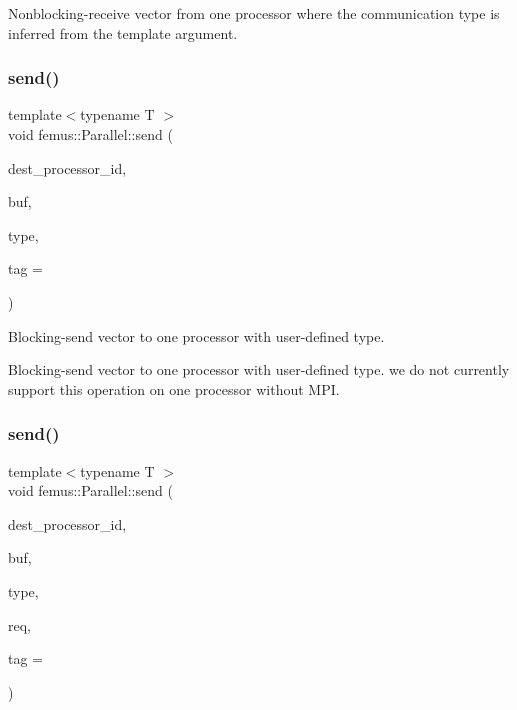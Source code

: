 Nonblocking-\/receive vector from one processor where the communication type is inferred from the template argument. \mbox{\label{namespacefemus_1_1_parallel_a3126d0149eca349995ce4f5a314e3a89}} 
\subsubsection{\texorpdfstring{send()}{send()}\hspace{0.1cm}{\footnotesize\ttfamily [1/4]}}
{\footnotesize\ttfamily template$<$typename T $>$ \\
void femus\+::\+Parallel\+::send (\begin{DoxyParamCaption}\item[{const unsigned int}]{dest\+\_\+processor\+\_\+id,  }\item[{std\+::vector$<$ T $>$ \&}]{buf,  }\item[{const \mbox{\hyperlink{classfemus_1_1_parallel_1_1_data_type}{Data\+Type}} \&}]{type,  }\item[{const int}]{tag = {} }\end{DoxyParamCaption})\hspace{0.3cm}{\ttfamily [inline]}}

Blocking-\/send vector to one processor with user-\/defined type.

Blocking-\/send vector to one processor with user-\/defined type. we do not currently support this operation on one processor without M\+PI. \mbox{\label{namespacefemus_1_1_parallel_a9e7ecc622b087c99acc5c1b37b6e6c90}} 
\subsubsection{\texorpdfstring{send()}{send()}\hspace{0.1cm}{\footnotesize\ttfamily [2/4]}}
{\footnotesize\ttfamily template$<$typename T $>$ \\
void femus\+::\+Parallel\+::send (\begin{DoxyParamCaption}\item[{const unsigned int}]{dest\+\_\+processor\+\_\+id,  }\item[{std\+::vector$<$ T $>$ \&}]{buf,  }\item[{const \mbox{\hyperlink{classfemus_1_1_parallel_1_1_data_type}{Data\+Type}} \&}]{type,  }\item[{\mbox{\hyperlink{structfemus_1_1_parallel_1_1request}{request}} \&}]{req,  }\item[{const int}]{tag = {} }\end{DoxyParamCaption})\hspace{0.3cm}{\ttfamily [inline]}}

